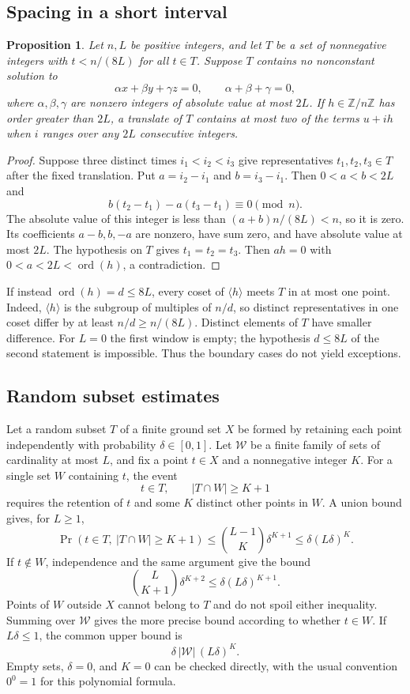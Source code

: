 \documentclass[11pt,a4paper]{article}
\newtheorem{proposition}{Proposition}[section]
\theoremstyle{remark}
\newcommand{\Z}{\mathbb Z}
\DeclareMathOperator{\ord}{ord}
\begin{document}
\subsection{Spacing in a short interval}
\begin{proposition}
Let $n,L$ be positive integers, and let $T$ be a set of nonnegative integers with
$t<n/(8L)$ for all $t\in T$. Suppose $T$ contains no nonconstant solution to
\[
 \alpha x+\beta y+\gamma z=0,
 \qquad \alpha+\beta+\gamma=0,
\]
where $\alpha,\beta,\gamma$ are nonzero integers of absolute value at most $2L$.
If $h\in\Z/n\Z$ has order greater than $2L$, a translate of $T$ contains at most two of the terms $u+ih$ when $i$ ranges over any $2L$ consecutive integers.
\end{proposition}
\begin{proof}
Suppose three distinct times $i_1<i_2<i_3$ give representatives $t_1,t_2,t_3\in T$ after the fixed translation. Put $a=i_2-i_1$ and $b=i_3-i_1$. Then $0<a<b<2L$ and
\[
 b(t_2-t_1)-a(t_3-t_1)\equiv0\pmod n.
\]
The absolute value of this integer is less than
$(a+b)n/(8L)<n$, so it is zero. Its coefficients $a-b,b,-a$ are nonzero, have sum zero, and have absolute value at most $2L$. The hypothesis on $T$ gives $t_1=t_2=t_3$. Then $ah=0$ with $0<a<2L<\ord(h)$, a contradiction.
\end{proof}

If instead $\ord(h)=d\le8L$, every coset of $\langle h\rangle$ meets $T$ in at most one point. Indeed, $\langle h\rangle$ is the subgroup of multiples of $n/d$, so distinct representatives in one coset differ by at least $n/d\ge n/(8L)$. Distinct elements of $T$ have smaller difference. For $L=0$ the first window is empty; the hypothesis $d\le8L$ of the second statement is impossible. Thus the boundary cases do not yield exceptions.

\subsection{Random subset estimates}
Let a random subset $T$ of a finite ground set $X$ be formed by retaining each point independently with probability $\delta\in[0,1]$. Let $\mathcal W$ be a finite family of sets of cardinality at most $L$, and fix a point $t\in X$ and a nonnegative integer $K$. For a single set $W$ containing $t$, the event
\[
 t\in T,\qquad |T\cap W|\ge K+1
\]
requires the retention of $t$ and some $K$ distinct other points in $W$. A union bound gives, for $L\ge1$,
\[
 \Pr(t\in T,\ |T\cap W|\ge K+1)
 \le \binom{L-1}{K}\delta^{K+1}
 \le\delta(L\delta)^K.
\]
If $t\notin W$, independence and the same argument give the bound
\[
 \binom{L}{K+1}\delta^{K+2}
 \le\delta(L\delta)^{K+1}.
\]
Points of $W$ outside $X$ cannot belong to $T$ and do not spoil either inequality. Summing over $\mathcal W$ gives the more precise bound according to whether $t\in W$. If $L\delta\le1$, the common upper bound is
\[
 \delta\,|\mathcal W|\,(L\delta)^K.
\]
Empty sets, $\delta=0$, and $K=0$ can be checked directly, with the usual convention $0^0=1$ for this polynomial formula.
\end{document}

